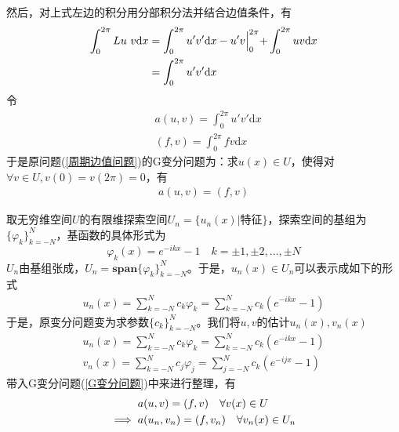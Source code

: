                 然后，对上式左边的积分用分部积分法并结合边值条件，有
                \begin{align*}
                    \int_0^{2\pi} Lu\ v \mathrm{d}x &= \int_0^{2\pi} u' v '\mathrm{d}x - u'v\Bigl|_0^{2\pi} + \int_0^{2\pi} u v \mathrm{d}x\\
                    &=\int_0^{2\pi} u' v '\mathrm{d}x
                \end{align*}
                令
                \begin{align*}
                    &a(u,v) = \int_0^{2\pi} u'v'\mathrm{d}x\\
                    &(f,v) = \int_0^{2\pi} fv\mathrm{d}x
                \end{align*}
                于是原问题(\ref{周期边值问题})的G变分问题为：求$u(x) \in U$，使得对$\forall v \in U, v(0) = v(2\pi) = 0$，有
                \begin{align}
                    \label{G变分问题}
                    a(u,v) = (f,v)
                \end{align}
                \par
                取无穷维空间$U$的有限维探索空间$U_n=\{u_n(x) |\text {特征}\}$，探索空间的基组为$\{\varphi_k\}_{k = -N}^{N}$，基函数的具体形式为
                \[
                    \varphi_k(x) = e^{-ikx} -1 \quad k = \pm 1, \pm 2,\dots,\pm N
                \]
                $U_n$由基组张成，$U_n = \mathbf{span} \{\varphi_k\}_{k = -N}^{N}$。于是，$u_n(x) \in U_n$可以表示成如下的形式
                \begin{align*}
                    u_n(x) = \sum_{k = -N}^{N} c_k \varphi_k = \sum_{k = -N}^{N} c_k (e^{-ikx} -1 )
                \end{align*}
                于是，原变分问题变为求参数$\{c_k\}_{k = -N}^{N}$。我们将$u,v$的估计$u_n(x),v_n(x)$
                \begin{align*}
                    u_n(x) = \sum_{k = -N}^{N} c_k \varphi_k = \sum_{k = -N}^{N} c_k (e^{-ikx} -1 )\\
                    v_n(x) = \sum_{k = -N}^{N} c_j \varphi_j = \sum_{j = -N}^{N} c_k (e^{-ijx} -1 )
                \end{align*}
                带入G变分问题(\ref{G变分问题})中来进行整理，有
                \begin{align}
                               &a(u,v) = (f,v) \quad \forall v(x)\in  U \notag\\
                    \implies {}&a(u_n,v_n) = (f,v_n)\quad \forall v_n(x) \in U_n
                \end{align}
